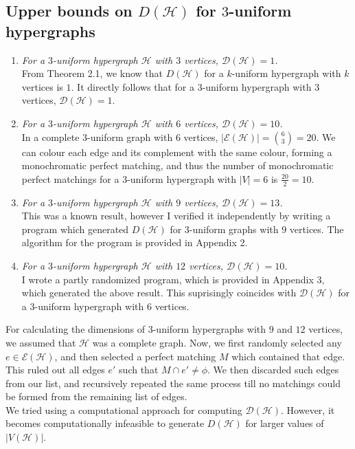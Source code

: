 \documentclass[11pt]{article}
\begin{document}
\subsection*{Upper bounds on $D(\mathcal{H})$ for $3$-uniform hypergraphs}
\begin{enumerate}
    \item \textit{For a $3$-uniform hypergraph $\mathcal{H}$ with $3$ vertices, $\mathcal{D}(\mathcal{H})=1$.}\\
    From Theorem 2.1, we know that $D(\mathcal{H})$ for a $k$-uniform hypergraph with $k$ vertices is $1$. It directly follows that for a $3$-uniform hypergraph with $3$ vertices, $\mathcal{D}(\mathcal{H})=1$.
    \item \textit{For a $3$-uniform hypergraph $\mathcal{H}$ with $6$ vertices, $\mathcal{D}(\mathcal{H})=10$.}\\
    In a complete $3$-uniform graph with $6$ vertices, $|\mathcal{E}(\mathcal{H})|=\displaystyle\binom{6}{3}=20$. We can colour each edge and its complement with the same colour, forming a monochromatic perfect matching, and thus the number of monochromatic perfect matchings for a $3$-uniform hypergraph with $|V|=6$ is $\frac{20}{2}=10$.
    \item \textit{For a $3$-uniform hypergraph $\mathcal{H}$ with $9$ vertices, $\mathcal{D}(\mathcal{H})=13$.}\\
    This was a known result, however I verified it independently by writing a program which generated $D(\mathcal{H})$ for $3$-uniform graphs with $9$ vertices. The algorithm for the program is provided in Appendix 2.
    \item \textit{For a $3$-uniform hypergraph $\mathcal{H}$ with $12$ vertices, $\mathcal{D}(\mathcal{H})=10$.}\\
    I wrote a partly randomized program, which is provided in Appendix 3, which generated the above result. This suprisingly coincides with $\mathcal{D}(\mathcal{H})$ for a $3$-uniform hypergraph with $6$ vertices.
\end{enumerate}
For calculating the dimensions of $3$-uniform hypergraphs with $9$ and $12$ vertices, we assumed that $\mathcal{H}$ was a complete graph. Now, we first randomly selected any $e \in \mathcal{E}(\mathcal{H})$, and then selected a perfect matching $M$ which contained that edge. This ruled out all edges $e'$ such that $M \cap e' \ne \phi$. We then discarded such edges from our list, and recursively repeated the same process till no matchings could be formed from the remaining list of edges.\medskip\\
We tried using a computational approach for computing $\mathcal{D}(\mathcal{H})$. However, it becomes computationally infeasible to generate $D(\mathcal{H})$ for larger values of $|V(\mathcal{H})|$.\bigskip\\
\end{document}
